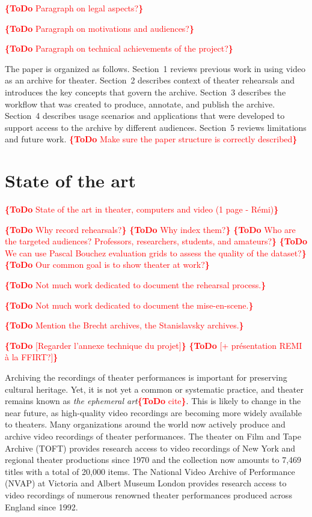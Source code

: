 \documentclass[conference]{IEEEtran}
\newcommand{\todo}[1]{\noindent\textcolor{red}{{\bf \{ToDo} #1{\bf \}}}}
\begin{document}
\todo{Paragraph on legal aspects?} 

\todo{Paragraph on motivations and audiences?} 

\todo{Paragraph on technical achievements of the project?}

The paper is organized as follows. Section~1 reviews previous work in using video as an archive for theater. Section~2 describes
context of theater rehearsals and introduces the key concepts that govern the archive. Section~3 describes the workflow that was
created to produce, annotate, and publish the archive. Section~4 describes usage scenarios and applications that were developed
to support access to the archive by different audiences. Section~5 reviews limitations and future work.
\todo{Make sure the paper structure is correctly described}


\section{State of the art}
\todo{State of the art in theater, computers and video (1 page - Rémi)}

\todo{Why record rehearsals?}
\todo{Why index them?}
\todo{Who are the targeted audiences? Professors, researchers, students, and amateurs?}
\todo{We can use Pascal Bouchez evaluation grids to assess the quality of the dataset?}
\todo{Our common goal is to show theater at work?}

\todo{Not much work dedicated to document the rehearsal process.}

\todo{Not much work dedicated to document the mise-en-scene.}

\todo{Mention the Brecht archives, the Stanislavsky archives.}

\todo{[Regarder l'annexe technique du projet]}
\todo{[+ présentation REMI à la FFIRT?]}

Archiving the recordings of theater performances is important for preserving  cultural heritage. 
Yet, it is not yet a common or systematic practice, and theater remains known as {\em the ephemeral art}\todo{cite}.
This is likely to change in the near future, as high-quality video recordings are becoming more widely
available to theaters.   Many organizations around the world now actively produce and
archive video recordings of theater performances. The theater on Film and Tape Archive
(TOFT) provides research access to video recordings of New York and regional theater productions
since 1970 and the collection now amounts to 7,469 titles with a total of 20,000 items. 
The National Video Archive of Performance (NVAP) at Victoria and Albert Museum London
provides research access to video recordings of numerous renowned theater performances produced
across England since 1992. 
\end{document}
